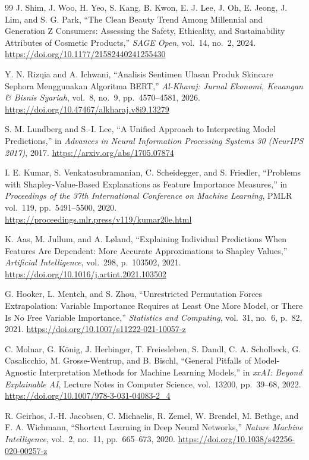 \begin{thebibliography}{99}
J. Shim, J. Woo, H. Yeo, S. Kang, B. Kwon, E. J. Lee, J. Oh, E. Jeong, J. Lim, and S. G. Park, ``The Clean Beauty Trend Among Millennial and Generation Z Consumers: Assessing the Safety, Ethicality, and Sustainability Attributes of Cosmetic Products,'' \emph{SAGE Open}, vol.~14, no.~2, 2024. \url{https://doi.org/10.1177/21582440241255430}

Y. N. Rizqia and A. Ichwani, ``Analisis Sentimen Ulasan Produk Skincare Sephora Menggunakan Algoritma BERT,'' \emph{Al-Kharaj: Jurnal Ekonomi, Keuangan \& Bisnis Syariah}, vol.~8, no.~9, pp.~4570--4581, 2026. \url{https://doi.org/10.47467/alkharaj.v8i9.13279}

S. M. Lundberg and S.-I. Lee, ``A Unified Approach to Interpreting Model Predictions,'' in \emph{Advances in Neural Information Processing Systems 30 (NeurIPS 2017)}, 2017. \url{https://arxiv.org/abs/1705.07874}

I. E. Kumar, S. Venkatasubramanian, C. Scheidegger, and S. Friedler, ``Problems with Shapley-Value-Based Explanations as Feature Importance Measures,'' in \emph{Proceedings of the 37th International Conference on Machine Learning}, PMLR vol.~119, pp.~5491--5500, 2020. \url{https://proceedings.mlr.press/v119/kumar20e.html}

K. Aas, M. Jullum, and A. L{\o}land, ``Explaining Individual Predictions When Features Are Dependent: More Accurate Approximations to Shapley Values,'' \emph{Artificial Intelligence}, vol.~298, p.~103502, 2021. \url{https://doi.org/10.1016/j.artint.2021.103502}

G. Hooker, L. Mentch, and S. Zhou, ``Unrestricted Permutation Forces Extrapolation: Variable Importance Requires at Least One More Model, or There Is No Free Variable Importance,'' \emph{Statistics and Computing}, vol.~31, no.~6, p.~82, 2021. \url{https://doi.org/10.1007/s11222-021-10057-z}

C. Molnar, G. K\"{o}nig, J. Herbinger, T. Freiesleben, S. Dandl, C. A. Scholbeck, G. Casalicchio, M. Grosse-Wentrup, and B. Bischl, ``General Pitfalls of Model-Agnostic Interpretation Methods for Machine Learning Models,'' in \emph{xxAI: Beyond Explainable AI}, Lecture Notes in Computer Science, vol.~13200, pp.~39--68, 2022. \url{https://doi.org/10.1007/978-3-031-04083-2_4}

R. Geirhos, J.-H. Jacobsen, C. Michaelis, R. Zemel, W. Brendel, M. Bethge, and F. A. Wichmann, ``Shortcut Learning in Deep Neural Networks,'' \emph{Nature Machine Intelligence}, vol.~2, no.~11, pp.~665--673, 2020. \url{https://doi.org/10.1038/s42256-020-00257-z}


\end{thebibliography}
